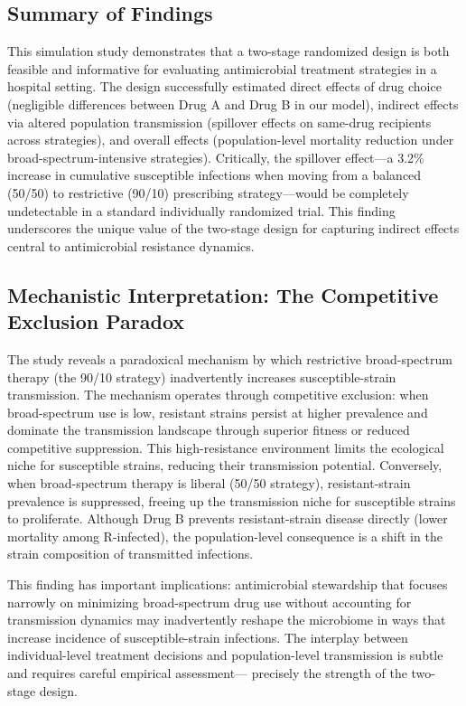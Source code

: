 \subsection{Summary of Findings}

This simulation study demonstrates that a two-stage randomized design is both feasible and informative
for evaluating antimicrobial treatment strategies in a hospital setting. The design successfully estimated
direct effects of drug choice (negligible differences between Drug A and Drug B in our model), indirect
effects via altered population transmission (spillover effects on same-drug recipients across strategies),
and overall effects (population-level mortality reduction under broad-spectrum-intensive strategies).
Critically, the spillover effect---a 3.2\% increase in cumulative susceptible infections when moving from
a balanced (50/50) to restrictive (90/10) prescribing strategy---would be completely undetectable in a
standard individually randomized trial. This finding underscores the unique value of the two-stage design
for capturing indirect effects central to antimicrobial resistance dynamics.

\subsection{Mechanistic Interpretation: The Competitive Exclusion Paradox}

The study reveals a paradoxical mechanism by which restrictive broad-spectrum therapy (the 90/10 strategy)
inadvertently increases susceptible-strain transmission. The mechanism operates through competitive exclusion:
when broad-spectrum use is low, resistant strains persist at higher prevalence and dominate the transmission
landscape through superior fitness or reduced competitive suppression. This high-resistance environment limits
the ecological niche for susceptible strains, reducing their transmission potential. Conversely, when
broad-spectrum therapy is liberal (50/50 strategy), resistant-strain prevalence is suppressed, freeing up
the transmission niche for susceptible strains to proliferate. Although Drug B prevents resistant-strain
disease directly (lower mortality among R-infected), the population-level consequence is a shift in the
strain composition of transmitted infections.

This finding has important implications: antimicrobial stewardship that focuses narrowly on minimizing
broad-spectrum drug use without accounting for transmission dynamics may inadvertently reshape the microbiome
in ways that increase incidence of susceptible-strain infections. The interplay between individual-level
treatment decisions and population-level transmission is subtle and requires careful empirical assessment---
precisely the strength of the two-stage design.

